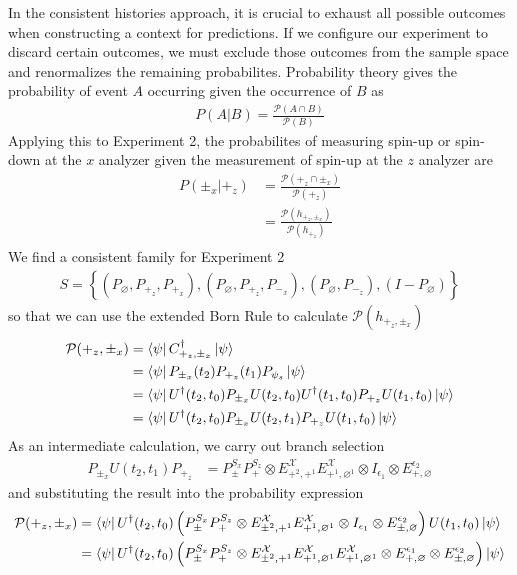 In the consistent histories approach, it is crucial to exhaust all possible outcomes when constructing a context for predictions. If we configure our experiment to discard certain outcomes, we must exclude those outcomes from the sample space and renormalizes the remaining probabilites. Probability theory gives the probability of event $A$ occurring given the occurrence of $B$ as
\begin{align}
  P(A|B) = \frac{\mathcal{P}(A\cap B)}{\mathcal{P}(B)}
\end{align}
Applying this to Experiment 2, the probabilites of measuring spin-up or spin-down at the $x$ analyzer given the measurement of spin-up at the $z$ analyzer are
\begin{align} \label{eq: conditional consecutive probability}
  P(\pm_x|+_z) &= \frac{{\mathcal{P}(+_z\cap \pm_x)}}{{\mathcal{P}(+_z)}} \\ \nonumber
  &= \frac{\mathcal{P}(h_{+_z, \pm_x})}{\mathcal{P}(h_{+_z})} \\ \nonumber
\end{align}
We find a consistent family for Experiment 2
\begin{align}
  S = \left\{\left(P_\varnothing, P_{+_z}, P_{+_x} \right), \left(P_\varnothing, P_{+_z}, P_{-_x} \right), \left(P_\varnothing, P_{-_z} \right), \left(I - P_\varnothing \right) \right\}
\end{align}
so that we can use the extended Born Rule to calculate $\mathcal{P}(h_{+_z, \pm_x})$
\begin{align}
  \mathcal{P}(+_z, \pm_x) &= \bra{\psi} C^\dagger_{+_z, \pm_x} \ket{\psi} \\ \nonumber
  &= \bra{\psi} P_{\pm_x}(t_2) P_{+_z}(t_1) P_{\psi_s} \ket{\psi} \\ \nonumber
  &= \bra{\psi} U^\dagger(t_2, t_0) P_{\pm_x} U(t_2, t_0) U^\dagger(t_1, t_0) P_{+_z} U(t_1, t_0)  \ket{\psi} \\ \nonumber
  &= \bra{\psi} U^\dagger(t_2, t_0) P_{\pm_x} U(t_2, t_1) P_{+_z} U(t_1, t_0) \ket{\psi}
\end{align}
As an intermediate calculation, we carry out branch selection
\begin{align}
   P_{\pm_x} U(t_2, t_1) P_{+_z} &= P^{S_x}_\pm P^{S_z}_+ \otimes E^\mathcal{X}_{+^2, +^1} E^\mathcal{X}_{+^1, \varnothing^1} \otimes I_{\epsilon_1} \otimes E^{\epsilon_2}_{+, \varnothing}
\end{align}
and substituting the result into the probability expression
\begin{align}
  \mathcal{P}(+_z, \pm_x) &= \bra{\psi} U^\dagger(t_2, t_0) \left(P^{S_x}_\pm P^{S_z}_+ \otimes E^\mathcal{X}_{\pm^2, +^1} E^\mathcal{X}_{+^1, \varnothing^1} \otimes I_{\epsilon_1} \otimes E^{\epsilon_2}_{\pm, \varnothing} \right) U(t_1, t_0) \ket{\psi} \\ \nonumber
  &= \bra{\psi}  U^\dagger(t_2, t_0) \left(P^{S_x}_\pm P^{S_z}_+ \otimes E^\mathcal{X}_{\pm^2, +^1} E^\mathcal{X}_{+^1, \varnothing^1}  E^{\mathcal{X}}_{+^1, \varnothing^1} \otimes E^{\epsilon_1}_{+, \varnothing} \otimes E^{\epsilon_2}_{\pm, \varnothing} \right) \ket{\psi}
\end{align}
